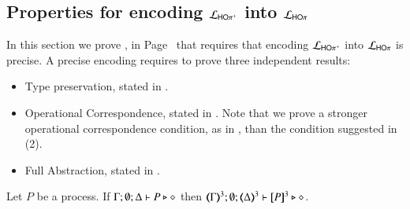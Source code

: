 

\subsection{Properties for encoding $\mathcal{L}_{\mathsf{HO\pi^{+}}}$ into $\mathcal{L}_{\mathsf{HO}\pi}$}
\label{app:HOpp_to_HOp}



In this section we prove , in Page~\pageref{f:enc:hopiptohopi}
that requires that encoding
$\mathcal{L}_{\mathsf{HO\pi^{+}}}$ into $\mathcal{L}_{\mathsf{HO}\pi}$ is precise.
A precise encoding requires to prove three independent results:
\begin{itemize}
	\item	Type preservation, stated in .
	\item	Operational Correspondence, stated in .
		Note that we prove a stronger operational correspondence condition,
		as in ,
		than the condition suggested in (2).
	\item	Full Abstraction, stated in .
\end{itemize}

\begin{proposition}\myrm
	\label{app:prop:typepres_HOpp_to_HOp}
	Let $P$ be a \HOpp process.
	If $\Gamma; \emptyset; \Delta \vdash P \triangleright \diamond$ then 
	$\tmap{\Gamma}{3}; \emptyset; \tmap{\Delta}{3} \proves \pmap{P}{3} \hastype \Proc$. 
\end{proposition}

